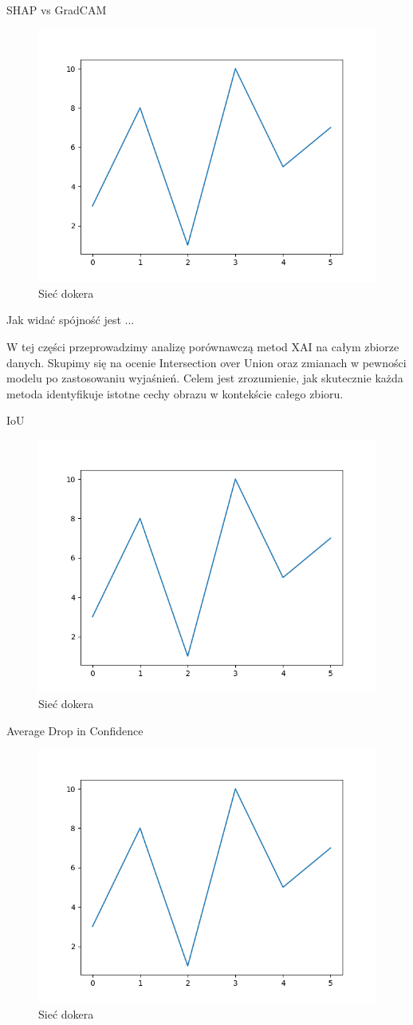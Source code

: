 SHAP vs GradCAM
\begin{figure}
	\centering\includegraphics[width=.6\textwidth]{images/example}
	\caption{Sieć dokera \cite{docker_compose_reference}}  \label{rys:network}
\end{figure}

Jak widać spójność jest ...

W tej części przeprowadzimy analizę porównawczą metod XAI na całym zbiorze danych.
Skupimy się na ocenie Intersection over Union oraz zmianach w pewności modelu po zastosowaniu wyjaśnień. Celem jest zrozumienie, jak skutecznie każda metoda identyfikuje istotne cechy obrazu w kontekście całego zbioru.

IoU
\begin{figure}
	\centering\includegraphics[width=.6\textwidth]{images/example}
	\caption{Sieć dokera \cite{docker_compose_reference}}  \label{rys:network}
\end{figure}

Average Drop in Confidence
\begin{figure}
	\centering\includegraphics[width=.6\textwidth]{images/example}
	\caption{Sieć dokera \cite{docker_compose_reference}}  \label{rys:network}
\end{figure}

